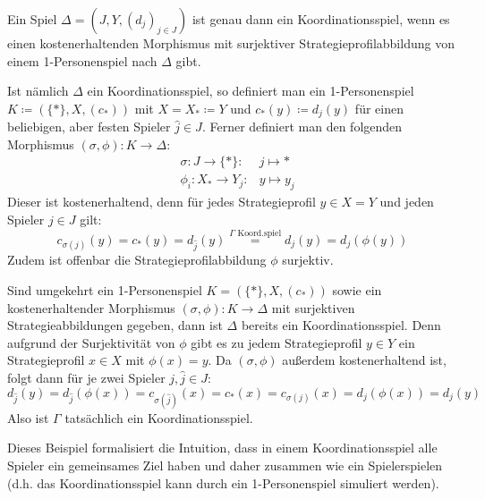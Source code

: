 \begin{bsp}
	Ein Spiel $\Delta = (J, Y, (d_j)_{j \in J})$ ist genau dann ein Koordinationsspiel, wenn es einen kostenerhaltenden Morphismus mit surjektiver Strategieprofilabbildung von einem 1-Personenspiel nach $\Delta$ gibt.
	
	Ist nämlich $\Delta$ ein Koordinationsspiel, so definiert man ein 1-Personenspiel $K \coloneqq (\{\ast\}, X, (c_\ast))$ mit $X = X_\ast \coloneqq Y$ und $c_\ast(y) \coloneqq d_j(y)$ für einen beliebigen, aber festen Spieler $\hat{j} \in J$. Ferner definiert man den folgenden Morphismus $(\sigma, \phi): K \to \Delta$:
	\begin{align*}
	&\sigma:	J		\to	 \{\ast\}:	&j	\mapsto	\ast  \\
	&\phi_i:	X_\ast	\to	 Y_j:		&y	\mapsto	y_j
	\end{align*}
	Dieser ist kostenerhaltend, denn für jedes Strategieprofil $y \in X = Y$ und jeden Spieler $j \in J$ gilt:
	\[c_{\sigma(j)}(y) = c_\ast(y) = d_{\hat{j}}(y) \overset{\Gamma \text{ Koord.spiel}}{=} d_j(y) = d_j(\phi(y))\]
	Zudem ist offenbar die Strategieprofilabbildung $\phi$ surjektiv.
	
	Sind umgekehrt ein 1-Personenspiel $K = (\{\ast\}, X, (c_\ast))$ sowie ein kostenerhaltender Morphismus  $(\sigma, \phi): K \to \Delta$ mit surjektiven Strategieabbildungen gegeben, dann ist $\Delta$ bereits ein Koordinationsspiel. Denn aufgrund der Surjektivität von $\phi$ gibt es zu jedem Strategieprofil $y \in Y$ ein Strategieprofil $x \in X$ mit $\phi(x) = y$. Da $(\sigma, \phi)$ außerdem kostenerhaltend ist, folgt dann für je zwei Spieler $j, \hat{j} \in J$: 
		\[d_{\hat{j}}(y) = d_{\hat{j}}(\phi(x)) = c_{\sigma(\hat{j})}(x) = c_\ast(x) = c_{\sigma(j)}(x) = d_j(\phi(x)) = d_j(y)\]
	Also ist $\Gamma$ tatsächlich ein Koordinationsspiel.
\end{bsp}

Dieses Beispiel formalisiert die Intuition, dass in einem Koordinationsspiel alle Spieler ein gemeinsames Ziel haben und daher zusammen \glqq wie ein Spieler\grqq spielen (d.h. das Koordinationsspiel kann durch ein 1-Personenspiel simuliert werden).

